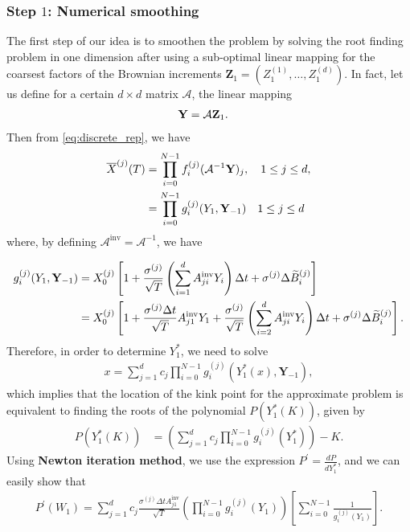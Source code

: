 \subsubsection{Step $1$: Numerical smoothing}\label{sec:Step $1$: Numerical smoothing}
The first step of our idea is to smoothen the problem by solving the root finding problem in one dimension after using a sub-optimal linear mapping for the coarsest factors of the Brownian increments $\mathbf{Z}_1=(Z^{(1)}_1 , \dots, Z^{(d)}_1)$. In fact, let us define for a certain $d \times d $ matrix $\mathcal{A} $, the linear mapping 
\begin{align}\label{eq:linear_transformation}
\mathbf{Y}&=\mathcal{A} \mathbf{Z}_1 .
\end{align}
Then from \eqref{eq:discrete_rep}, we have
 \begin{align}\label{eq:discrete_rep_2}
	\overline{X}^{(j)}(T)&= \prod_{i=0}^{N-1} f_i^{(j)}(\mathcal{A}^{-1} \mathbf{Y})_{j} , \quad 1 \le j \le d , \nonumber \\
&=\prod_{i=0}^{N-1} g_i^{(j)}(Y_{1},\mathbf{Y}_{-1}) \quad 1 \le j \le d 
\end{align}
where, by defining $\mathcal{A}^{\text{inv}}= \mathcal{A}^{-1}$, we have

\begin{align}\label{eq: incremental functions}
g_i^{(j)}(Y_1,\mathbf{Y}_{-1})&=X_0^{(j)}  \left[ 1+\frac{\sigma^{(j)}}{\sqrt{T}} \left( \sum_{i=1}^d A^{\text{inv}}_{ji} Y_i \right) \Delta t+ \sigma^{(j)} \Delta \widetilde{B}^{(j)}_{i}\right] \nonumber\\
&=X_0^{(j)}  \left[ 1+\frac{\sigma^{(j)} \Delta t}{\sqrt{T}} A^{\text{inv}}_{j1} Y_1 +\frac{\sigma^{(j)}}{\sqrt{T}} \left( \sum_{i=2}^d A^{\text{inv}}_{ji} Y_i  \right) \Delta t+ \sigma^{(j)} \Delta \widetilde{B}^{(j)}_{i}\right] .
\end{align}
Therefore, in order to determine $Y^{\ast}_1$, we need to solve
\begin{align}
	x=\sum_{j=1}^{d} c_j \prod_{i=0}^{N-1} g_i^{(j)}(Y^{\ast}_1(x),\mathbf{Y}_{-1} ),
\end{align}
which implies that the location of the kink point for the approximate problem is equivalent to finding the roots of the polynomial $P(Y^\ast_1(K))$, given by
\begin{align}\label{polynomial_kink_location_basket}
	P(Y^\ast_1(K))&=\left(\sum_{j=1}^{d} c_j \prod_{i=0}^{N-1}  g_i^{(j)}(Y^{\ast}_1) \right) -K.
\end{align}
Using  \textbf{Newton iteration method}, we use the expression $P^\prime=\frac{d P}{d Y^\ast_1}$, and we can easily show that
\begin{align}\label{polynomial_kink_location_derivative_basket}
	P^\prime(W_1)=\sum_{j=1}^{d} c_j \frac{\sigma^{(j)} \Delta t A^{\text{inv}}_{j1}} {\sqrt{T}} \left( \prod_{i=0}^{N-1} g_i^{(j)}(Y_1) \right) \left[ \sum_{i=0}^{N-1} \frac{1}{g_i^{(j)}(Y_1)}\right].
\end{align}



